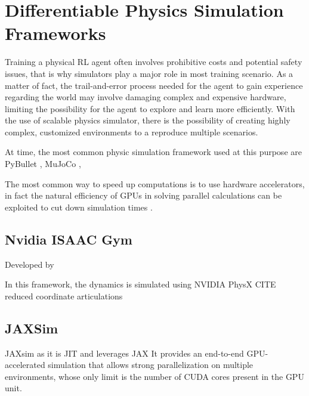 \chapter{Differentiable Physics Simulation Frameworks}
\label{chp:back_PhysicsSimulators}

Training a physical \ac{RL} agent often involves prohibitive costs and potential safety issues, that is why simulators play a major role in most training scenario. As a matter of fact, the trail-and-error process needed for the agent to gain experience regarding the world may involve damaging complex and expensive hardware, limiting the possibility for the agent to explore and learn more efficiently.
With the use of scalable physics simulator, there is the possibility of creating highly complex, customized environments to a reproduce multiple scenarios.

At time, the most common physic simulation framework used at this purpose are PyBullet \cite{coumans_pybullet_2016}, MuJoCo \cite{todorov_mujoco_2012},

The most common way to speed up computations is to use hardware accelerators, in fact the natural efficiency of \ac{GPU}s in solving parallel calculations can be exploited to cut down simulation times \cite{liang_gpu-accelerated_2018}.

\section{Nvidia ISAAC Gym}

Developed by \cite{makoviychuk_isaac_2021}

In this framework, the dynamics is simulated using NVIDIA PhysX CITE reduced coordinate articulations

\section{JAXSim}

JAXsim \cite{ferigo_jaxsim_2022} as it is \ac{JIT} and leverages JAX \cite{bradbury_jax_2018}
It provides an end-to-end GPU-accelerated simulation that allows strong parallelization on multiple environments, whose only limit is the number of \ac{CUDA} cores present in the GPU unit.

